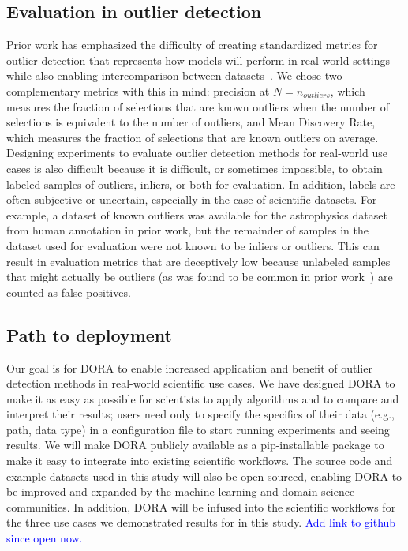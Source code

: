 \documentclass[utf8]{frontiersFPHY} %
\newcommand{\todo}[1]{\textcolor{blue}{#1}}
\begin{document}
\subsection{Evaluation in outlier detection} 
Prior work has emphasized
the difficulty of creating standardized metrics for outlier detection that 
represents how models will perform in real world settings while also enabling
intercomparison between datasets~\cite{campos2016evaluation}. We chose two
complementary metrics with this in mind: precision at $N=n_{outliers}$, which
measures the fraction of selections that are known outliers when the number of
selections is equivalent to the number of outliers, and
Mean Discovery Rate, which measures the fraction of selections that are known 
outliers on average. 
Designing experiments to evaluate outlier detection methods for real-world
use cases is also difficult because it is difficult, or sometimes impossible, 
to obtain labeled samples of outliers, inliers, or both for evaluation. 
In addition, labels are often subjective or uncertain, 
especially in the case of scientific datasets. For example, a dataset of known
outliers was available for the astrophysics dataset from human annotation
in prior work, but the remainder of samples in the dataset used for evaluation
were not known to be inliers or outliers. This can result in evaluation metrics
that are deceptively low because unlabeled samples that might actually be
outliers (as was found to be common in prior work~\cite{wagstaff:des-anom20})
are counted as false positives. 

\subsection{Path to deployment} 
Our goal is for DORA to enable increased application and benefit of
outlier detection methods in real-world scientific use cases. We have 
designed DORA to make it as easy as possible for scientists to apply
algorithms and to compare and interpret their results; users need only
to specify the specifics of their data (e.g., path, data type) in a 
configuration file to start running experiments and seeing results. We will
make DORA publicly available as a pip-installable package to make it
easy to integrate into existing scientific workflows. 
The source code and example datasets used in this study will also be 
open-sourced, enabling DORA to be improved and expanded by the 
machine learning and domain science communities. 
In addition, DORA will be infused into the scientific workflows for the
three use cases we demonstrated results for in this study.
\todo{Add link to github since open now.}
\end{document}
